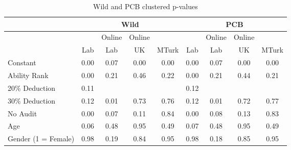 \begin{table}[H]
\centering
\begin{tabular}{lcccc|cccc}
  \hline
  \hline
 & \multicolumn{4}{c}{\textbf{Wild}} & \multicolumn{4}{c}{\textbf{PCB}}\\
 \hline
 & & Online & Online & & & Online & Online & \\
 & Lab & Lab & UK & MTurk & Lab & Lab & UK & MTurk\\
 \hline
Constant & 0.00 & 0.07 & 0.00 & 0.00 & 0.00 & 0.07 & 0.00 & 0.00 \\
  Ability Rank & 0.00 & 0.21 & 0.46 & 0.22 & 0.00 & 0.21 & 0.44 & 0.21 \\
  20\% Deduction & 0.11 &  &  &  & 0.12 &  &  &  \\
  30\% Deduction & 0.12 & 0.01 & 0.73 & 0.76 & 0.12 & 0.01 & 0.72 & 0.77 \\
  No Audit & 0.00 & 0.07 & 0.11 & 0.84 & 0.00 & 0.08 & 0.13 & 0.83 \\
  Age & 0.06 & 0.48 & 0.95 & 0.49 & 0.07 & 0.48 & 0.95 & 0.49 \\
  Gender (1 = Female) & 0.98 & 0.19 & 0.84 & 0.95 & 0.98 & 0.18 & 0.85 & 0.95 \\
   \hline
\end{tabular}
\caption{Wild and PCB clustered p-values}
\label{table:cluster}
\end{table}
